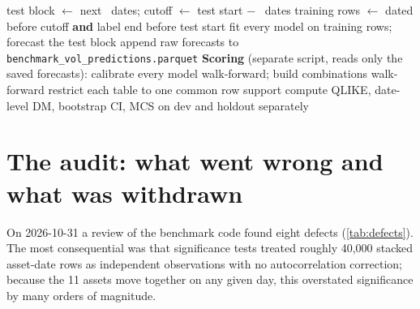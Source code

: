 \documentclass[11pt,a4paper]{article}
\begin{document}
\begin{algorithm}[!htbp]
\caption{Audited evaluation pipeline}\label{alg:protocol}
\begin{algorithmic}[1]
  \State test block $\gets$ next \TestDays\ dates; cutoff $\gets$ test start $-$ \EmbargoDays\ dates
  \State training rows $\gets$ dated before cutoff \textbf{and} label end before test start
  \State fit every model on training rows; forecast the test block
  \State append raw forecasts to \texttt{benchmark\_vol\_predictions.parquet}
\EndFor
\State \textbf{Scoring} (separate script, reads only the saved forecasts):
\State \quad calibrate every model walk-forward; build combinations walk-forward
\State \quad restrict each table to one common row support
\State \quad compute QLIKE, date-level DM, bootstrap CI, MCS on dev and holdout separately
\end{algorithmic}
\end{algorithm}

\section{The audit: what went wrong and what was withdrawn}\label{sec:audit}

On 2026-10-31 a review of the benchmark code found eight defects (\cref{tab:defects}). The most
consequential was that significance tests treated roughly 40,000 stacked asset-date rows as
independent observations with no autocorrelation correction; because the 11 assets move together on
any given day, this overstated significance by many orders of magnitude.
\end{document}
